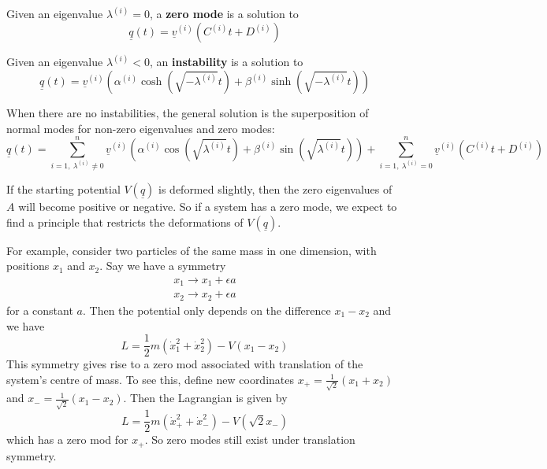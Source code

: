 \begin{definition}
	Given an eigenvalue $\lambda^{(i)} = 0$, a \textbf{zero mode} is a solution to
	\[
		\underline{q}(t) = \underline{v}^{(i)} \left( C^{(i)} t + D^{(i)} \right)
	\]
\end{definition}

\begin{definition}
	Given an eigenvalue $\lambda^{(i)} < 0$, an \textbf{instability} is a solution to
	\[
		\underline{q}(t) = \underline{v}^{(i)} \left( \alpha^{(i)} \cosh(\sqrt{-\lambda^{(i)}} t) + \beta^{(i)} \sinh(\sqrt{-\lambda^{(i)}} t) \right)
	\]
\end{definition}

\begin{definition}
	When there are no instabilities, the general solution is the superposition of normal modes for non-zero eigenvalues and zero modes:
	\[
		\underline{q}(t) = \sum_{i = 1, \ \lambda^{(i)} \ne 0}^{n} \underline{v}^{(i)} \left( \alpha^{(i)} \cos(\sqrt{\lambda^{(i)}} t) + \beta^{(i)} \sin(\sqrt{\lambda^{(i)}} t) \right) + \sum_{i = 1, \ \lambda^{(i)} = 0}^{n} \underline{v}^{(i)} \left( C^{(i)} t + D^{(i)} \right)
	\]
\end{definition}

\begin{remark}
	If the starting potential $V(\underline{q})$ is deformed slightly, then the zero eigenvalues of $A$ will become positive or negative. So if a system has a zero mode, we expect to find a principle that restricts the deformations of $V(\underline{q})$.

	For example, consider two particles of the same mass in one dimension, with positions $x_1$ and $x_2$. Say we have a symmetry
	\[
		\begin{aligned}
			x_1 \to x_1 + \epsilon a \\
			x_2 \to x_2 + \epsilon a
		\end{aligned}
	\]
	for a constant $a$. Then the potential only depends on the difference $x_1 - x_2$ and we have
	\[
		L = \frac{1}{2} m (\dot{x}_1^2 + \dot{x}_2^2) - V(x_1 - x_2)
	\]
	This symmetry gives rise to a zero mod associated with translation of the system's centre of mass. To see this, define new coordinates $x_+ = \frac{1}{\sqrt{2}} (x_1 + x_2)$ and $x_- = \frac{1}{\sqrt{2}} (x_1 - x_2)$. Then the Lagrangian is given by
	\[
		L = \frac{1}{2} m (\dot{x}_+^2 + \dot{x}_-^2) - V(\sqrt{2} x_-)
	\]
	which has a zero mod for $x_+$. So zero modes still exist under translation symmetry.
\end{remark}

